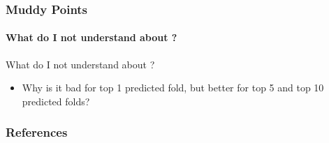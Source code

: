 \documentclass[xcolor={usenames,dvipsnames},hyperref={hyperindex,bookmarks}]{beamer}
\begin{document}
\frame
{
	\frametitle{Muddy Points}
	\framesubtitle{What do I not understand about \cite{Hou2018}?}

	What do I not understand about \cite{Hou2018}?
	\begin{itemize}
	\item Why is it bad for top 1 predicted fold, but better for top 5 and top 10 predicted folds?
	\end{itemize}

}















\frame
{
	\frametitle{References}



	{\linespread{1}
	
	
	}
}
\end{document}
